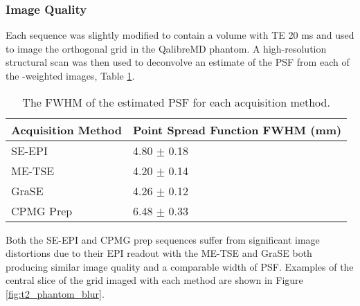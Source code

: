 \subsubsection{Image Quality}

Each sequence was slightly modified to contain a volume with TE 20 ms and used to image the orthogonal grid in the QalibreMD phantom. A high-resolution structural scan was then used to deconvolve an estimate of the \ac{PSF} from each of the \ttwo-weighted images, Table \ref{tab:t2_phantom_blur}. 

\begin{table}[H]
	\centering
	\begin{tabular}{l|l}
		Acquisition   Method & Point   Spread Function FWHM (mm) \\ \hline
		SE-EPI               & 4.80   $\pm$ 0.18                 \\ \hline
		ME-TSE               & 4.20 $\pm$ 0.14                   \\ \hline
		GraSE                & 4.26   $\pm$ 0.12                 \\ \hline
		CPMG   \ttwo Prep    & 6.48   $\pm$ 0.33                    
	\end{tabular}
	\caption{The \ac{FWHM} of the estimated \ac{PSF} for each acquisition method.}
	\label{tab:t2_phantom_blur}
\end{table}

Both the \ac{SE}-\ac{EPI} and \ac{CPMG} \ttwo prep sequences suffer from significant image distortions due to their \ac{EPI} readout with the \ac{ME-TSE} and \ac{GraSE} both producing similar image quality and a comparable width of \ac{PSF}. Examples of the central slice of the grid imaged with each method are shown in Figure \ref{fig:t2_phantom_blur}. 

